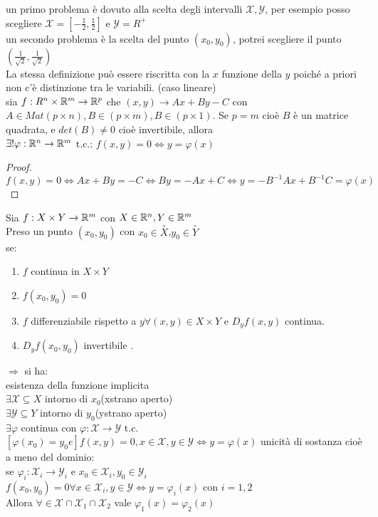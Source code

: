 	un primo problema è dovuto alla scelta degli intervalli $\mathcal{X},\mathcal{Y}$, per esempio posso scegliere $\mathcal{X}=[-\frac{1}{2},\frac{1}{2}]$ e $\mathcal{Y}=R^+$\\
	un secondo problema è la scelta del punto $(x_0,y_0)$, potrei scegliere il punto $(\frac{1}{\sqrt{2}},\frac{1}{\sqrt{2}})$\\
\observation
La stessa definizione può essere riscritta con la $x$ funzione della $y$ poiché a priori non c'è distinzione tra le variabili.
\proposition (caso lineare)\\
sia $f:R^n\times \mathbb{R}^m\rightarrow \mathbb{R}^p$ che $(x,y)\rightarrow Ax+By-C$ con $A\in Mat(p \times n), B\in (p \times m), B\in (p \times 1)$. Se $p=m$ cioè $B$ è un matrice quadrata, e $det(B)\ne 0$ cioè invertibile, allora\\
$\exists !\varphi : \mathbb{R}^n\rightarrow \mathbb{R}^m$ t.c.: $f(x,y)=0 \Leftrightarrow y=\varphi(x)$
\begin{proof}
	$f(x,y)=0\Leftrightarrow Ax+By=-C\Leftrightarrow By=-Ax+C\Leftrightarrow y=-B^{-1}Ax+B^{-1}C = \varphi(x)$
\end{proof}
\proposition
Sia $f:X\times Y\rightarrow \mathbb{R}^m$ con $X\in \mathbb{R}^n, Y\in \mathbb{R}^m$\\
Preso un punto $(x_0,y_0)$ con $x_0\in \overset{\circ}{X}$,$y_0\in \overset{\circ}{Y}$\\
se:
\begin{enumerate}
	\item $f$ continua in $X\times Y$
	\item $f(x_0,y_0)=0$
	\item $f$ differenziabile rispetto a $y \forall (x,y)\in X\times Y$ e $D_yf(x,y)$ continua.
	\item $D_yf(x_0,y_0)$ invertibile .
\end{enumerate}
$\Rightarrow $ si ha:\\
esistenza della funzione implicita\\
$\exists \mathcal{X}\subseteq X$ intorno di $x_0$(xstrano aperto)\\
$\exists \mathcal{Y}\subseteq Y$ intorno di $y_0$(ystrano aperto)\\
$\exists\varphi$ continua con $\varphi:\mathcal{X}\rightarrow\mathcal{Y}$ t.c. $[\varphi (x_0)=y_0 e] f(x,y)=0, x\in\mathcal{X},y\in\mathcal{Y} \Leftrightarrow y=\varphi(x)$
unicità di sostanza cioè a meno del dominio:\\
se $\varphi_i:\mathcal{X}_i\rightarrow\mathcal{Y}_i$ e $x_0\in\mathcal{X}_i,y_0\in\mathcal{Y}_i$\\
$f(x_0,y_0)=0 \forall x\in\mathcal{X}_i, y\in \mathcal{Y}\Leftrightarrow y=\varphi_i(x)$ con $i=1,2$\\
Allora $\forall\in\mathcal{X}\cap\mathcal{X}_1\cap\mathcal{X}_2$ vale $\varphi_1(x)=\varphi_2(x)$

